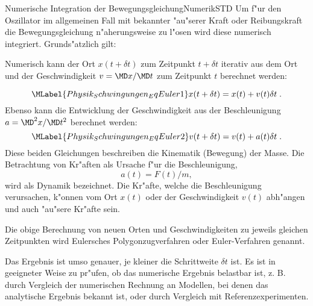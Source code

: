 
% 
\begin{MXContent}{Numerische Integration der Bewegungsgleichung}{Numerik}{STD}%
Um f"ur den Oszillator im allgemeinen Fall mit bekannter "au"serer Kraft oder Reibungskraft die Bewegungsgleichung n"aherungsweise zu l"osen wird diese numerisch integriert. 
Grunds"atzlich gilt:

\begin{MInfo}
Numerisch kann der Ort $x(t+\delta t)$ zum Zeitpunkt $t+\delta t$ iterativ aus dem Ort und der Geschwindigkeit $v=\MD x / \MD t$ zum Zeitpunkt $t$ berechnet werden:

\begin{equation}\MLabel{Physik_Schwingungen_EqEuler1}
  x(t+\delta t) = x(t) + v(t) \delta t  \; .
\end{equation}
Ebenso kann die Entwicklung der Geschwindigkeit aus der Beschleunigung $a=\MD^2 x / \MD t^2$ berechnet werden:
\begin{equation}\MLabel{Physik_Schwingungen_EqEuler2}
  v(t+\delta t) = v(t) + a(t) \delta t  \; . 
\end{equation}
Diese beiden Gleichungen beschreiben die Kinematik (Bewegung) der Masse. Die Betrachtung von Kr"aften als Ursache f"ur die Beschleunigung, $$a(t)=F(t)/m,$$ wird als Dynamik bezeichnet. Die Kr"afte, welche die Beschleunigung verursachen, k"onnen vom Ort $x(t)$ oder der Geschwindigkeit $v(t)$ abh"angen und auch "au"sere Kr"afte sein.

Die obige Berechnung von neuen Orten und Geschwindigkeiten zu jeweils gleichen Zeitpunkten wird Eulersches Polygonzugverfahren oder Euler-Verfahren genannt.

\end{MInfo}

Das Ergebnis ist umso genauer, je kleiner die Schrittweite $\delta t$ ist. Es ist in geeigneter Weise zu pr"ufen, ob das numerische Ergebnis belastbar ist, z. B. durch Vergleich der numerischen Rechnung an Modellen, bei denen das analytische Ergebnis bekannt ist, oder durch Vergleich mit Referenzexperimenten.


\end{MXContent}
